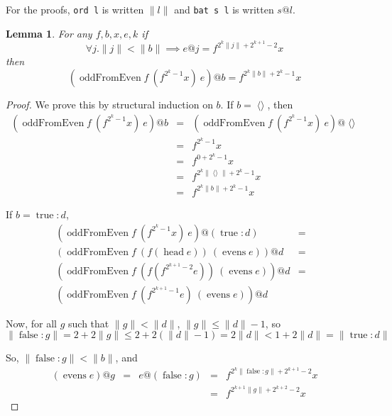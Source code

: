 \documentclass{llncs}
\DeclareMathOperator{\oddFrom}{oddFromEven}
\DeclareMathOperator{\nil}{\langle\rangle}
\DeclareMathOperator{\true}{true}
\DeclareMathOperator{\false}{false}
\DeclareMathOperator{\head}{head}
\DeclareMathOperator{\evens}{evens}
\newcommand{\ord}[1]{\|#1\|}
\newcommand{\cons}[2]{#1:#2}
\newtheorem{lemma}[theorem]{Lemma}
\begin{document}
For the proofs, \verb|ord l| is written $\ord{l}$ and \verb|bat s l| is written $s@l$.

\begin{lemma}\label{oddFromLemma}
For any $f, b, x, e, k$
if
\begin{displaymath}
\forall j . \ord{j} < \ord{b} \implies e@j = f^{2^k\ord{j}+2^{k+1}-2}x
\end{displaymath}
then
\begin{displaymath}
(\oddFrom f\ (f^{2^k-1}x)\ e)@b = f^{2^k\ord{b}+2^k-1}x
\end{displaymath}
\end{lemma}
\begin{proof}
We prove this by structural induction on $b$. If $b = \nil$, then 
\begin{displaymath}
\begin{array}{rcl}
(\oddFrom f\ (f^{2^k-1}x)\ e)@b & = & (\oddFrom f\ (f^{2^k-1}x)\ e)@\nil \\
& = & f^{2^k-1}x \\
& = & f^{0+2^k-1}x \\
& = & f^{2^k\ord{\nil}+2^k-1}x \\
& = & f^{2^k\ord{b}+2^k-1}x
\end{array}
\end{displaymath}

If $b = \cons{\true}{d}$,
\begin{displaymath}
\begin{array}{rcl}
(\oddFrom f\ (f^{2^k-1}x)\ e)@(\cons{\true}{d})& = & \\
(\oddFrom f\ (f (\head e))\ (\evens e))@d& = & \\
(\oddFrom f\ (f (f^{2^{k+1}-2}e))\ (\evens e))@d& = & \\
(\oddFrom f\ (f^{2^{k+1}-1}e)\ (\evens e))@d&  & 
\end{array}
\end{displaymath}

Now, for all $g$ such that $\ord{g} < \ord{d}$, $\ord{g} \leq \ord{d}-1$, so 
\begin{displaymath}
\ord{\cons{\false}{g}} = 2 + 2\ord{g} \leq 2 + 2(\ord{d} -1) = 2\ord{d} < 1+2\ord{d} = \ord{\cons{\true}{d}}
\end{displaymath}

So, $\ord{\cons{\false}{g}} < \ord{b}$, and 
\begin{displaymath}
\begin{array}{rcccl}
(\evens e)@g & = & e@(\cons{\false}{g}) & = & f^{2^k\ord{\cons{\false}{g}}+2^{k+1}-2}x \\
& & & = & f^{2^{k+1}\ord{g}+2^{k+2}-2}x 
\end{array}
\end{displaymath}


\end{proof}
\end{document}
